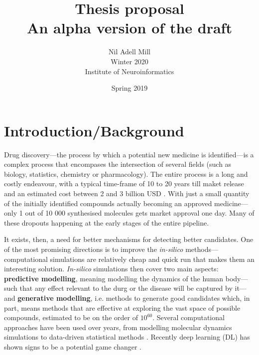 \documentclass{article}
\begin{document}
\title{\Large Thesis proposal \\ \small An alpha version of the draft}
\author{Nil Adell Mill \\
        Winter 2020 \\
        Institute of Neuroinformatics \\}
\date{Spring 2019}

\maketitle

    \section*{Introduction/Background}  

Drug discovery—the process by which a potential new medicine is identified---is a
 complex process that encompases the intersection of several fields (such as biology,
 statistics, chemistry or pharmacology). The entire process is a long and costly
 endeavour, with a typical time-frame of 10 to 20 years till maket release and an
 estimated cost between 2 and 3 billion USD \cite{Schneider2019, Scannell2012}. With
 just a small quantity of the initially identified compounds actually becoming an
 approved medicine—only 1 out of 10 000 synthesised molecules gets market approval one
 day. Many of these dropouts happening at the early stages of the entire pipeline.

It exists, then, a need for better mechanisms for detecting better candidates. One of
 the most promising directions is to improve the \emph{in-silico}
 methods---computational simulations are relatively cheap and quick run that makes them
 an interesting solution. \emph{In-silico} simulations then cover two main aspects:
 \textbf{predictive modelling}, meaning modelling the dynamics of the human body---such
 that any effect relevant to the durg or the disease will be captured by it---and
 \textbf{generative modelling}, i.e. methods to generate good candidates which, in part,
 means methods that are effective at exploring the vast space of possible compounds,
 estimated to be on the order of $10^{60}$\cite{Reymond2012}.
 Several computational approaches have been used over years, from modelling molecular
 dynamics simulations to data-driven statistical methods \cite{Hung2014, Kuhn2016}.
 Recently deep learning (DL) has shown signs to be a potential game changer
 \cite{Dargan2019}. 


\end{document}
